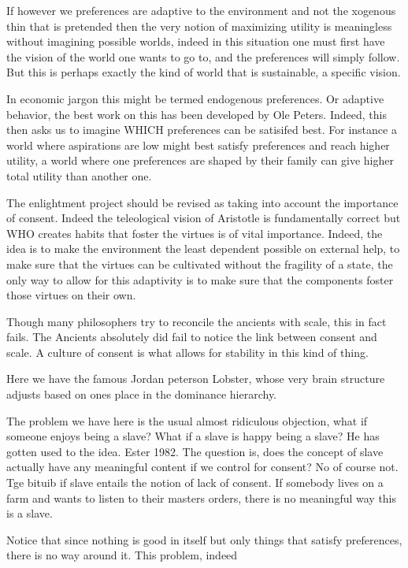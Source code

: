 \documentclass[12pt]{report}
\numberwithin{equation}{section}
\begin{document}
If however we preferences are adaptive to the environment and not the xogenous thin that is pretended then the very notion of maximizing utility is meaningless without imagining possible worlds, indeed in this situation one must first have the vision of the world one wants to go to, and the preferences will simply follow. But this is perhaps exactly the kind of world that is sustainable, a specific vision. 

In economic jargon this might be termed endogenous preferences. Or adaptive behavior, the best work on this has been developed by Ole Peters. Indeed, this then asks us to imagine WHICH preferences can be satisifed best. For instance a world where aspirations are low might best satisfy preferences and reach higher utility, a world where one preferences are shaped by their family can give higher total utility than another one. 

The enlightment project should be revised as taking into account the importance of consent. Indeed the teleological vision of Aristotle is fundamentally correct but WHO creates habits that foster the virtues is of vital importance. Indeed, the idea is to make the environment the least dependent possible on external help, to make sure that the virtues can be cultivated without the fragility of a state, the only way to allow for this adaptivity is to make sure that the components foster those virtues on their own. 

Though many philosophers try to reconcile the ancients with scale, this in fact fails. The Ancients absolutely did fail to notice the link between consent and scale. A culture of consent is what allows for stability in this kind of thing. 

Here we have the famous Jordan peterson Lobster, whose very brain structure adjusts based on ones place in the dominance hierarchy. 

The problem we have here is the usual almost ridiculous objection, what if someone enjoys being a slave? What if a slave is happy being a slave? He has gotten used to the idea. Ester 1982. The question is, does the concept of slave actually have any meaningful content if we control for consent? No of course not. Tge bituib if slave entails the notion of lack of consent. If somebody lives on a farm and wants to listen to their masters orders, there is no meaningful way this is a slave. 


Notice that since nothing is good in itself but only things that satisfy preferences, there is no way around it. This problem, indeed 
\end{document}
